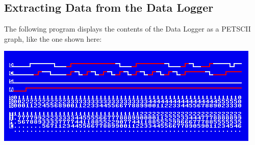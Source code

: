 \subsection{Extracting Data from the Data Logger}

The following program displays the contents of the Data Logger as a
PETSCII graph, like the one shown here:

\begin{center}
  \includegraphics[width=0.7\linewidth]{images/IEC-Timing-Diagrams/iec-waveform-cropped}
\end{center}




